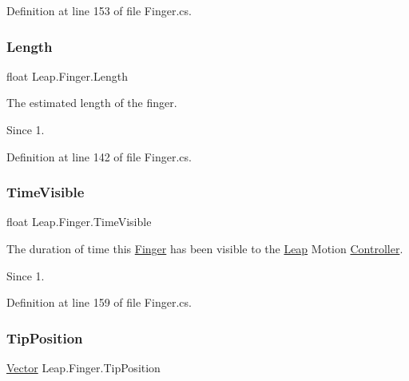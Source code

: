 Definition at line 153 of file Finger.\+cs.

\mbox{\label{class_leap_1_1_finger_a063bc32c63fc331e0af54907af53c1b4}} 
\subsubsection{\texorpdfstring{Length}{Length}}
{\footnotesize\ttfamily float Leap.\+Finger.\+Length}



The estimated length of the finger. 

\begin{DoxySince}{Since}
1. 
\end{DoxySince}


Definition at line 142 of file Finger.\+cs.

\mbox{\label{class_leap_1_1_finger_af1bc0f13b6c56b1292e17e4c62b264a9}} 
\subsubsection{\texorpdfstring{TimeVisible}{TimeVisible}}
{\footnotesize\ttfamily float Leap.\+Finger.\+Time\+Visible}



The duration of time this \mbox{\hyperlink{class_leap_1_1_finger}{Finger}} has been visible to the \mbox{\hyperlink{namespace_leap}{Leap}} Motion \mbox{\hyperlink{class_leap_1_1_controller}{Controller}}. 

\begin{DoxySince}{Since}
1. 
\end{DoxySince}


Definition at line 159 of file Finger.\+cs.

\mbox{\label{class_leap_1_1_finger_aae573cee6c1bdefd293838f133235b2d}} 
\subsubsection{\texorpdfstring{TipPosition}{TipPosition}}
{\footnotesize\ttfamily \mbox{\hyperlink{struct_leap_1_1_vector}{Vector}} Leap.\+Finger.\+Tip\+Position}



